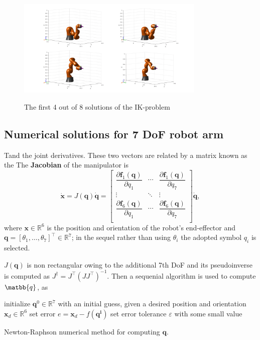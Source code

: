\begin{center}
\begin{figure}[!htb]
\centering
\includegraphics[width=0.8\textwidth]{images/ik-4-solutions.png}\\
\caption{The first 4 out of 8 solutions of the IK-problem}
\end{figure}
\end{center}

\subsection{Numerical solutions for 7 DoF robot arm}

Tand the joint derivatives. These two vectors are related by a matrix known as the 
The \textbf{Jacobian} of the manipulator is 
\begin{equation}
\mathbf{\dot{x}} = J( \mathbf{q} ) \mathbf{\dot{q}} =
\begin{bmatrix}
\dfrac{\partial \mathbf{f}_1(\mathbf{q})}{\partial q_{1}} & \cdots & \dfrac{\partial \mathbf{f}_1(\mathbf{q})}{\partial q_{7}} \\
\vdots & \ddots & \vdots \\
\dfrac{\partial \mathbf{f}_6(\mathbf{q})}{\partial q_{1}} & \cdots & \dfrac{\partial \mathbf{f}_6(\mathbf{q})}{\partial q_{7}} \\
\end{bmatrix} 
\mathbf{\dot{q}},
\end{equation}
where $\mathbf{x} \in \mathbb{R}^6$ is the position and orientation of the robot's end-effector and $\mathbf{q} =\left[ \theta_1,\ldots,\theta_7\right]^{\top} \in \mathbb{R}^7$; in the sequel rather than using $\theta_i$ the adopted symbol $q_i$ is selected.

$J( \mathbf{q} )$ is non rectangular owing to the additional 7th DoF and its pseudoinverse is computed as $J^{\dagger} = J^\top ( J J^\top )^{-1}$. Then a sequenial algorithm is used to compute $\matbb{q}$, as
\begin{algorithm}[H]
\SetAlgoLined
initialize $\mathbf{q}^0 \in \mathbb{R}^{7}$ with an initial guess, given a desired position and orientation $\mathbf{x}_d \in \mathbb{R}^{6}$\;
set error $e = \mathbf{x}_d - f(\mathbf{q^i})$\;
set error tolerance $ε$ with some small value\;
\caption{Newton-Raphson numerical method for computing $\mathbf{q}$.}
\end{algorithm}

